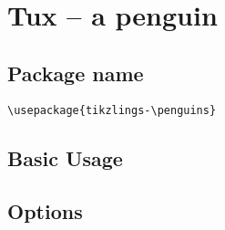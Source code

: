 \documentclass[parskip=half]{scrartcl}
\begin{document}
\begin{tcblisting}{}
\owl[feet=red]
\end{tcblisting}

\begin{tcblisting}{}
\owl[3D]
\end{tcblisting}




\clearpage
\section{Tux -- a penguin}

\subsection{Package name}

\begin{tcolorbox}
\vspace*{0.5cm}
\lstinline|\usepackage{tikzlings-\penguins}|
\vspace*{0.5cm}
\end{tcolorbox}

\subsection{Basic Usage}

\begin{tcblisting}{}
\penguin
\end{tcblisting}

\subsection{Options}

\begin{tcblisting}{}
\penguin[body=SteelBlue]
\end{tcblisting}

\begin{tcblisting}{}
\penguin[belly=red]
\end{tcblisting}

\begin{tcblisting}{}
\penguin[feet=red]
\end{tcblisting}

\begin{tcblisting}{}
\penguin[bill=red]
\end{tcblisting}

\begin{tcblisting}{}
\penguin[eye=red]
\end{tcblisting}

\begin{tcblisting}{}
\penguin[pupil=red]
\end{tcblisting}

\begin{tcblisting}{}
\penguin[3D]
\end{tcblisting}
\end{document}
